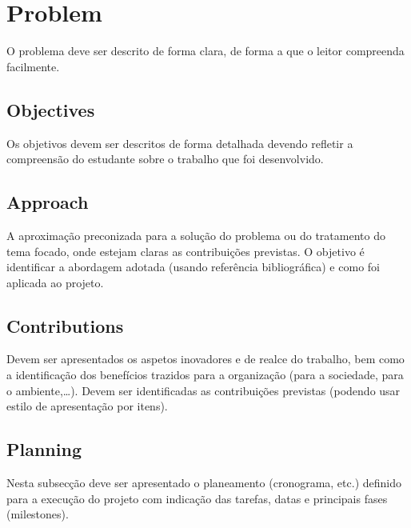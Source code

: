 \section{Problem} %
\label{sec:problem}

O problema deve ser descrito de forma clara, de forma a que o leitor compreenda facilmente.

\subsection{Objectives} %
\label{sec:objectives}

Os objetivos devem ser descritos de forma detalhada devendo refletir a compreensão do estudante sobre o trabalho que foi desenvolvido.


\subsection{Approach} %
\label{sec:approach}

A aproximação preconizada para a solução do problema ou do tratamento do tema focado, onde estejam claras as contribuições previstas. O objetivo é identificar a abordagem adotada (usando referência bibliográfica) e como foi aplicada ao projeto.


\subsection{Contributions} %
\label{sec:contributions}

Devem ser apresentados os aspetos inovadores e de realce do trabalho, bem como a identificação dos benefícios trazidos para a organização (para a sociedade, para o ambiente,…). Devem ser identificadas as contribuições previstas (podendo usar estilo de apresentação por itens).


\subsection{Planning} %
\label{sec:planning}

Nesta subsecção deve ser apresentado o planeamento (cronograma, etc.) definido para a execução do projeto com indicação das tarefas, datas e principais fases (milestones).


